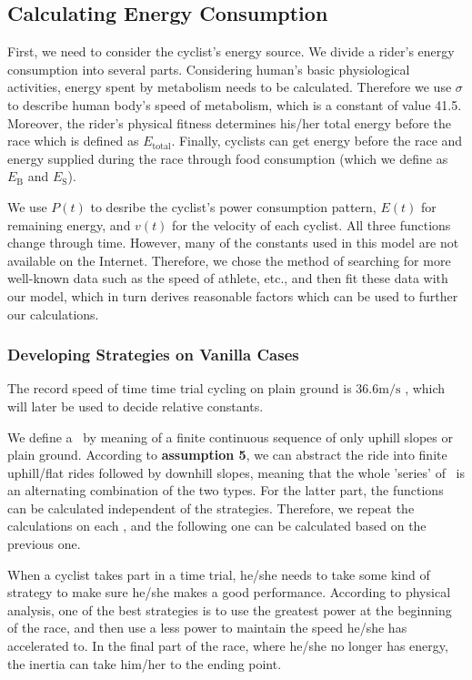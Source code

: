 \documentclass{article}
\begin{document}
		\subsection{Calculating Energy Consumption}
			First, we need to consider the cyclist's energy source. We divide a rider's energy consumption into several parts. Considering human's basic physiological activities, energy spent by metabolism needs to be calculated. Therefore we use $\sigma$ to describe human body's speed of metabolism, which is a constant of value 41.5. Moreover, the rider's physical fitness determines his/her total energy before the race which is defined as $ E _\mathrm{total}$. Finally, cyclists can get energy before the race and energy supplied during the race through food consumption (which we define as $ E _\mathrm{B}$ and $ E _\mathrm{S}$).

			We use $P(t)$ to desribe the cyclist's power consumption pattern, $E(t)$ for remaining energy, and $v(t)$ for the velocity of each cyclist. All three functions change through time. However, many of the constants used in this model are not available on the Internet. Therefore, we chose the method of searching for more well-known data such as the speed of athlete, etc., and then fit these data with our model, which in turn derives reasonable factors which can be used to further our calculations.

			\subsubsection{Developing Strategies on Vanilla Cases}
			The record speed of time time trial cycling on plain ground is 36.6$\mathrm{m/s}$ \cite{time trial record}, which will later be used to decide relative constants.

			We define a \ by meaning of a finite continuous sequence of only uphill slopes or plain ground. According to \textbf{assumption 5}, we can abstract the ride into finite uphill/flat rides followed by downhill slopes, meaning that the whole 'series' of \ is an alternating combination of the two types. For the latter part, the functions can be calculated independent of the strategies. Therefore, we repeat the calculations on each , and the following one can be calculated based on the previous one.

			When a cyclist takes part in a time trial, he/she needs to take some kind of strategy to make sure he/she makes a good performance. According to physical analysis, one of the best strategies is to use the greatest power at the beginning of the race, and then use a less power to maintain the speed he/she has accelerated to. In the final part of the race, where he/she no longer has energy, the inertia can take him/her to the ending point.
\end{document}
